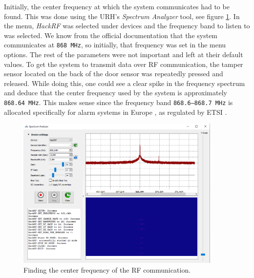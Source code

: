 Initially, the center frequency at which the system communicates had to be found. This was done using the URH's \textit{Spectrum Analyzer} tool, see figure \ref{fig:finding-center-freq}. In the menu, \textit{HackRF} was selected under devices and the frequency band to listen to was selected. We know from the official documentation that the system communicates at \texttt{868 MHz}, so initially, that frequency was set in the menu options. The rest of the parameters were not important and left at their default values. To get the system to transmit data over RF communication, the tamper sensor located on the back of the door sensor was repeatedly pressed and released. While doing this, one could see a clear spike in the frequency spectrum and deduce that the center frequency used by the system is approximately \texttt{868.64 MHz}. This makes sense since the frequency band \texttt{868.6–868.7 MHz} is allocated specifically for alarm systems in Europe , as regulated by ETSI .
\begin{figure}[!ht]
    \centering
    \includegraphics[width=0.9\textwidth]{images/6-pentesting/find-frequency.png}
    \caption{Finding the center frequency of the RF communication.}
    \label{fig:finding-center-freq}
\end{figure}

